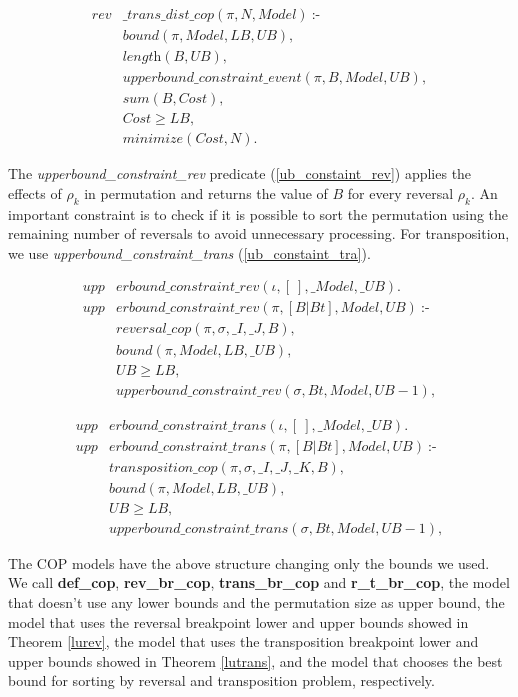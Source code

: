 \begin{align}
  \label{trarevdistcop}
  \textit{rev}&\textit{\_trans\_dist\_cop}(\pi, N, Model)~\text{:-} \nonumber\\
  &\textit{bound}(\pi, Model, LB, UB), \nonumber\\
  &\textit{length}(B, UB), \nonumber \\
  &\textit{upperbound\_constraint\_event}(\pi, B, Model, UB), \\
  &\textit{sum}(B, Cost), \nonumber \\
  &\textit{Cost} \ge \textit{LB}, \nonumber \\
  &\textit{minimize}(Cost, N). \nonumber
\end{align}

The \textit{upperbound\_constraint\_rev} predicate
(\ref{ub_constaint_rev}) applies the effects of $\rho_{k}$ in
permutation and returns the value of $B$ for every reversal
$\rho_{k}$. An important constraint is to check if it is possible to
sort the permutation using the remaining number of reversals to avoid
unnecessary processing. For transposition, we use
\textit{upperbound\_constraint\_trans} (\ref{ub_constaint_tra}).

\begin{align}
  \label{ub_constaint_rev}
  \textit{upp}&\textit{erbound\_constraint\_rev}(\iota, [~], \_Model, \_UB). \nonumber\\
  \textit{upp}&\textit{erbound\_constraint\_rev}(\pi, [B|Bt], Model, UB)~\text{:-} \nonumber\\
  &\textit{reversal\_cop}(\pi, \sigma, \_I, \_J, B), \\
  &\textit{bound}(\pi, Model, LB, \_UB), \nonumber\\
  &UB \ge LB, \nonumber \\
  &\textit{upperbound\_constraint\_rev}(\sigma, Bt, Model, UB - 1), \nonumber 
\end{align}

\begin{align}
  \label{ub_constaint_tra}
  \textit{upp}&\textit{erbound\_constraint\_trans}(\iota, [~], \_Model, \_UB). \nonumber\\
  \textit{upp}&\textit{erbound\_constraint\_trans}(\pi, [B|Bt], Model, UB)~\text{:-} \nonumber\\
  &\textit{transposition\_cop}(\pi, \sigma, \_I, \_J, \_K, B), \\
  &\textit{bound}(\pi, Model, LB, \_UB), \nonumber\\
  &UB \ge LB, \nonumber \\
  &\textit{upperbound\_constraint\_trans}(\sigma, Bt, Model, UB - 1), \nonumber 
\end{align}

The COP models have the above structure changing only the bounds we
used. We call \textbf{def\_cop}, \textbf{rev\_br\_cop},
\textbf{trans\_br\_cop} and \textbf{r\_t\_br\_cop}, the model
that doesn't use any lower bounds and the permutation size as upper
bound, the model that uses the reversal breakpoint lower and upper
bounds showed in Theorem \ref{lurev}, the model that uses the
transposition breakpoint lower and upper bounds showed in Theorem
\ref{lutrans}, and the model that chooses the best bound for sorting
by reversal and transposition problem, respectively.
